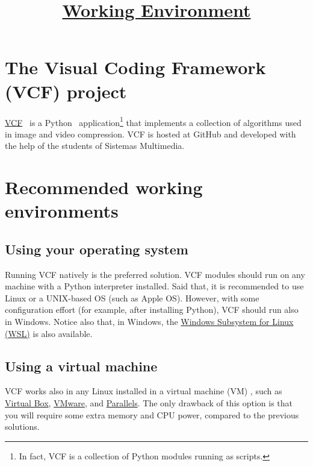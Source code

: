 

\title{\href{https://sistemas-multimedia.github.io/contents/working_environment/}{Working Environment}}

\maketitle

\tableofcontents

\section{The Visual Coding Framework (VCF) project}
\href{https://github.com/Sistemas-Multimedia/VCF}{VCF}~\cite{vruiz__VCF}
is a Python~\cite{python} application\footnote{In fact, VCF is a
collection of Python modules running as scripts.} that implements a
collection of algorithms used in image and video compression. VCF is
hosted at GitHub and developed with the help of the students of
Sistemas Multimedia.

\section{Recommended working environments}

\subsection{Using your operating system}
Running VCF natively is the preferred solution. VCF modules should run
on any machine with a Python interpreter installed. Said that, it is
recommended to use Linux or a UNIX-based OS (such as Apple
OS). However, with some configuration effort (for example, after
installing Python), VCF should run also in Windows. Notice also that,
in Windows, the
\href{https://learn.microsoft.com/en-us/windows/wsl/install}{Windows
  Subsystem for Linux (WSL)} is also available.

\subsection{Using a virtual machine}
VCF works also in any Linux installed in a virtual machine (VM) , such
as \href{https://www.virtualbox.org/}{Virtual Box},
\href{https://www.vmware.com/}{VMware}, and
\href{https://www.vmware.com/}{Parallels}.  The only drawback of this
option is that you will require some extra memory and CPU power,
compared to the previous solutions.

